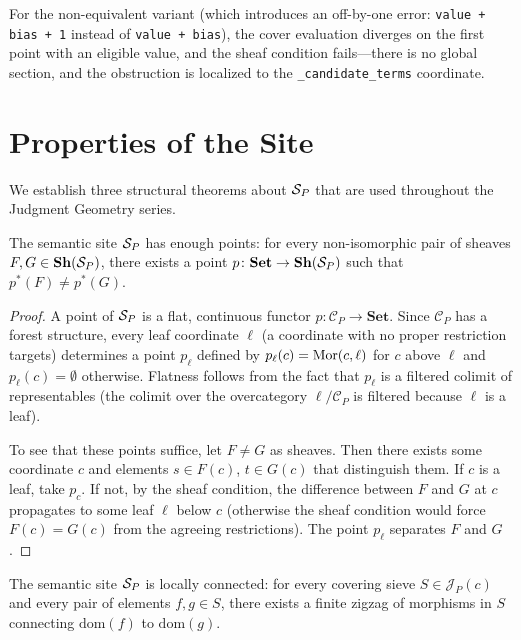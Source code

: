 \documentclass[11pt]{article}
\begin{document}
For the non-equivalent variant (which introduces an off-by-one error:
\texttt{value + bias + 1} instead of \texttt{value + bias}), the cover
evaluation diverges on the first point with an eligible value, and the sheaf
condition fails---there is no global section, and the obstruction is localized
to the \texttt{\_candidate\_terms} coordinate.

\section{Properties of the Site}\label{sec:properties}

We establish three structural theorems about $\mathcal{S}_P$ that are used
throughout the Judgment Geometry series.

\begin{theorem}\label{thm:enough-points}
The semantic site $\mathcal{S}_P$ has enough points: for every non-isomorphic
pair of sheaves $F, G \in \mathbf{Sh}(\mathcal{S}_P)$, there exists a point
$p \colon \mathbf{Set} \to \mathbf{Sh}(\mathcal{S}_P)$ such that $p^*(F) \neq
p^*(G)$.
\end{theorem}

\begin{proof}
A point of $\mathcal{S}_P$ is a flat, continuous functor
$p \colon \mathcal{C}_P \to \mathbf{Set}$.  Since $\mathcal{C}_P$ has a
forest structure, every leaf coordinate $\ell$ (a coordinate with no proper
restriction targets) determines a point $p_\ell$ defined by
$p_\ell(c) = \mathrm{Mor}(c, \ell)$ for $c$ above $\ell$ and $p_\ell(c) = \emptyset$
otherwise.  Flatness follows from the fact that $p_\ell$ is a filtered
colimit of representables (the colimit over the overcategory $\ell / \mathcal{C}_P$
is filtered because $\ell$ is a leaf).

To see that these points suffice, let $F \neq G$ as sheaves.  Then there
exists some coordinate $c$ and elements $s \in F(c)$, $t \in G(c)$ that
distinguish them.  If $c$ is a leaf, take $p_c$.  If not, by the sheaf
condition, the difference between $F$ and $G$ at $c$ propagates to some leaf
$\ell$ below $c$ (otherwise the sheaf condition would force $F(c) = G(c)$
from the agreeing restrictions).  The point $p_\ell$ separates $F$ and $G$.
\end{proof}

\begin{theorem}\label{thm:locally-connected}
The semantic site $\mathcal{S}_P$ is locally connected: for every covering sieve
$S \in \mathscr{J}_P(c)$ and every pair of elements $f, g \in S$, there
exists a finite zigzag of morphisms in $S$ connecting $\mathrm{dom}(f)$ to
$\mathrm{dom}(g)$.
\end{theorem}
\end{document}
